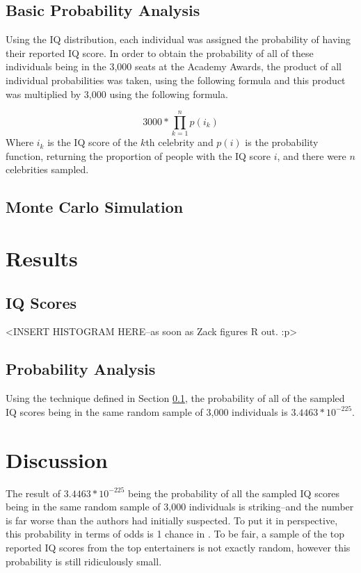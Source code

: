 \documentclass[12pt,letterpaper,titlepage,oneside,draft]{article}
\begin{document}
\subsection{Basic Probability Analysis}
\label{probanal}
Using the IQ distribution, each individual was assigned the probability of having their reported IQ score. In order to obtain the probability of all of these individuals being in the 3,000 seats at the Academy Awards, the product of all individual probabilities was taken, using the following formula and this product was multiplied by 3,000 using the following formula.

\begin{equation}
3000 * \prod_{k=1}^n p(i_k)
\end{equation}
Where $i_k$ is the IQ score of the $k$th celebrity and $p(i)$ is the probability function, returning the proportion of people with the IQ score $i$, and there were $n$ celebrities sampled.

\subsection{Monte Carlo Simulation} 

\section{Results}
\subsection{IQ Scores}
<INSERT HISTOGRAM HERE--as soon as Zack figures R out. :p>

\subsection{Probability Analysis}
Using the technique defined in Section \ref{probanal}, the probability of all of the sampled IQ scores being in the same random sample of 3,000 individuals is $3.4463 * 10^{-225}$.

\section{Discussion}
The result of $3.4463 * 10^{-225}$ being the probability of all the sampled IQ scores being in the same random sample of 3,000 individuals is striking--and the number is far worse than the authors had initially suspected. To put it in perspective, this probability in terms of odds is 1 chance in . To be fair, a sample of the top reported IQ scores from the top entertainers is not exactly random, however this probability is still ridiculously small.
\end{document}

